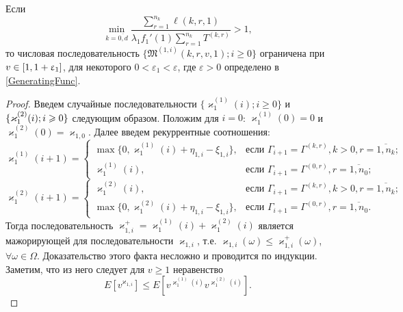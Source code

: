 \begin{lemma}
Если 
$$
\min_{k=\overline{0,d}} { \frac{\sum_{r = 1}^{n_k} \ell(k,r,1) }{\lambda_1 f_1'(1) \sum_{r=1}^{n_k} T^{(k,r)} }}>1,
$$
то числовая последовательность $\{\mathfrak{M}^{(1,i)}(k,r,v,1); i\geqslant 0\}$ ограничена при $v \hm\in [1, 1+\varepsilon_1]$, для некоторого $ 0 < \varepsilon_1 < \varepsilon$, где $\varepsilon>0$ определено в \eqref{GeneratingFunc}.
\label{generating:1:limited}
\end{lemma}
\begin{proof}
 Введем случайные последовательности $\{\varkappa_{1}^{(1)}(i); i\geqslant0\}$ и $\{\varkappa_{1}^{(2)}(i); i \hm\geqslant 0\}$ следующим образом. Положим для $i=0$: $\varkappa_{1}^{(1)}(0)=0$ и $\varkappa_{1}^{(2)}(0)=\varkappa_{1,0}$. Далее введем рекуррентные соотношения:  
\begin{equation*}
  \varkappa_{1}^{(1)}(i+1) =
  \begin{cases}
    \max{\{0,\varkappa_{1}^{(1)}(i) + \eta_{1,i} - \xi_{1,i}\}},&  \text{если } \Gamma_{i+1}=\Gamma^{(k,r)}, k>0, r=\overline{1,n_k}; \\
    \varkappa_{1}^{(1)}(i),&  \text{если } \Gamma_{i+1}=\Gamma^{(0,r)}, r=\overline{1,n_0};
  \end{cases}
\end{equation*}
\begin{equation*}
  \varkappa_{1}^{(2)}(i+1) =
  \begin{cases}
    \varkappa_{1}^{(2)}(i),&  \text{если } \Gamma_{i+1}=\Gamma^{(k,r)}, k>0, r=\overline{1,n_k};\\
    \max{\{0,\varkappa_{1}^{(2)}(i) + \eta_{1,i} - \xi_{1,i}\}},&  \text{если } \Gamma_{i+1}=\Gamma^{(0,r)}, r=\overline{1,n_0}.
  \end{cases}
\end{equation*}
Тогда последовательность $\varkappa_{1,i}^+=\varkappa_{1}^{(1)}(i) + \varkappa_{1}^{(2)}(i)$ является мажорирующей для последовательности $\varkappa_{1,i}$, т.е. $\varkappa_{1,i}(\omega) \leqslant \varkappa_{1,i}^+(\omega)$, $\forall \omega \in \Omega$. Доказательство этого факта несложно и проводится по индукции. Заметим, что из него следует для $v\geqslant 1$ неравенство
\begin{equation}
E[v^{\varkappa_{1,i}}]\leqslant E[v^{\varkappa_{1}^{(1)}(i)} v^{\varkappa_{1}^{(2)}(i)}].
\label{cenzor:estimate}
\end{equation}
                               


\end{proof}
